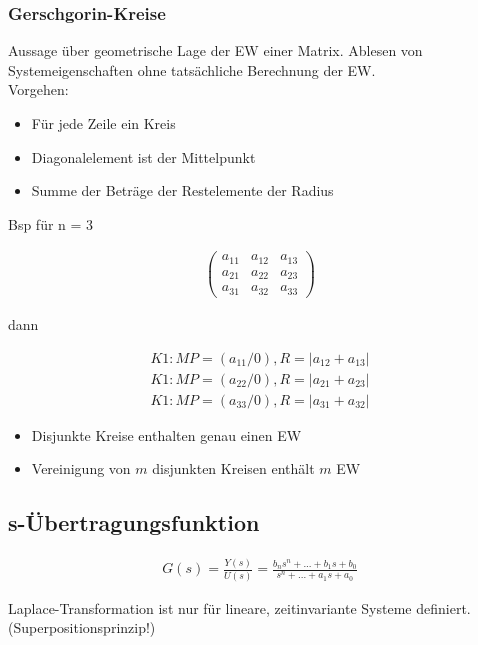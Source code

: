 \documentclass[10pt,a4paper]{article}
\begin{document}
  \subsubsection{Gerschgorin-Kreise}
Aussage über geometrische Lage der EW einer Matrix.
Ablesen von Systemeigenschaften ohne tatsächliche Berechnung der EW.\\
Vorgehen:
  \begin{itemize}
    \item Für jede Zeile ein Kreis
    \item Diagonalelement ist der Mittelpunkt
    \item Summe der Beträge der Restelemente der Radius
  \end{itemize}
Bsp für n = 3
  \begin{mdframed}[style=exercise]
    \begin{align}
        \begin{pmatrix}
             a_{11} & a_{12} & a_{13} \\
             a_{21} & a_{22} & a_{23} \\
             a_{31} & a_{32} & a_{33} 
        \end{pmatrix}
    \end{align}
  \end{mdframed}
  dann
  \begin{mdframed}[style=exercise]
    \begin{align}
        K1: MP=(a_{11}/0), R=|a_{12}+a_{13}|\\
        K1: MP=(a_{22}/0), R=|a_{21}+a_{23}|\\
        K1: MP=(a_{33}/0), R=|a_{31}+a_{32}|
    \end{align}
  \end{mdframed}
  \begin{itemize}
    \item Disjunkte Kreise enthalten genau einen EW
    \item Vereinigung von $m$ disjunkten Kreisen enthält $m$ EW
  \end{itemize}

  \subsection{s-Übertragungsfunktion}
  \begin{mdframed}[style=exercise]
    \begin{align}
        G(s)=\frac{Y(s)}{U(s)}= \frac{b_n s^{n}+...+b_1s+b_0 } {s^{n}+...+a_1s+a_0 }
    \end{align}
  \end{mdframed}
  Laplace-Transformation ist nur für lineare, zeitinvariante Systeme definiert. (Superpositionsprinzip!)
\end{document}
